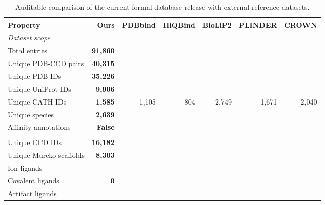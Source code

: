 \begin{table}[t]
\centering
\small
\begin{threeparttable}
\caption{Auditable comparison of the current formal database release with external reference datasets.}
\label{tab:dataset-comparison}
\begin{adjustbox}{max width=\textwidth}
\begin{tabular}{lrrrrrr}
\toprule
Property & \textbf{Ours} & PDBbind & HiQBind & BioLiP2 & PLINDER & CROWN \\
\midrule
\multicolumn{7}{l}{\textit{Dataset scope}} \\
Total entries & \textbf{91,860} & \textemdash{} & \textemdash{} & \textemdash{} & \textemdash{} & \textemdash{} \\
Unique PDB-CCD pairs & \textbf{40,315} & \textemdash{} & \textemdash{} & \textemdash{} & \textemdash{} & \textemdash{} \\
Unique PDB IDs & \textbf{35,226} & \textemdash{} & \textemdash{} & \textemdash{} & \textemdash{} & \textemdash{} \\
Unique UniProt IDs & \textbf{9,906} & \textemdash{} & \textemdash{} & \textemdash{} & \textemdash{} & \textemdash{} \\
Unique CATH IDs & \textbf{1,585} & 1,105 & 804 & 2,749 & 1,671 & 2,040 \\
Unique species & \textbf{2,639} & \textemdash{} & \textemdash{} & \textemdash{} & \textemdash{} & \textemdash{} \\
Affinity annotations & \textbf{False} & \textemdash{} & \textemdash{} & \textemdash{} & \textemdash{} & \textemdash{} \\
\addlinespace
\multicolumn{7}{l}{\textit{Ligand diversity}} \\
Unique CCD IDs & \textbf{16,182} & \textemdash{} & \textemdash{} & \textemdash{} & \textemdash{} & \textemdash{} \\
Unique Murcko scaffolds & \textbf{8,303} & \textemdash{} & \textemdash{} & \textemdash{} & \textemdash{} & \textemdash{} \\
Ion ligands & \textbf{\textemdash{}} & \textemdash{} & \textemdash{} & \textemdash{} & \textemdash{} & \textemdash{} \\
Covalent ligands & \textbf{0} & \textemdash{} & \textemdash{} & \textemdash{} & \textemdash{} & \textemdash{} \\
Artifact ligands & \textbf{\textemdash{}} & \textemdash{} & \textemdash{} & \textemdash{} & \textemdash{} & \textemdash{} \\

\end{tabular}
\end{adjustbox}
\end{threeparttable}
\end{table}
